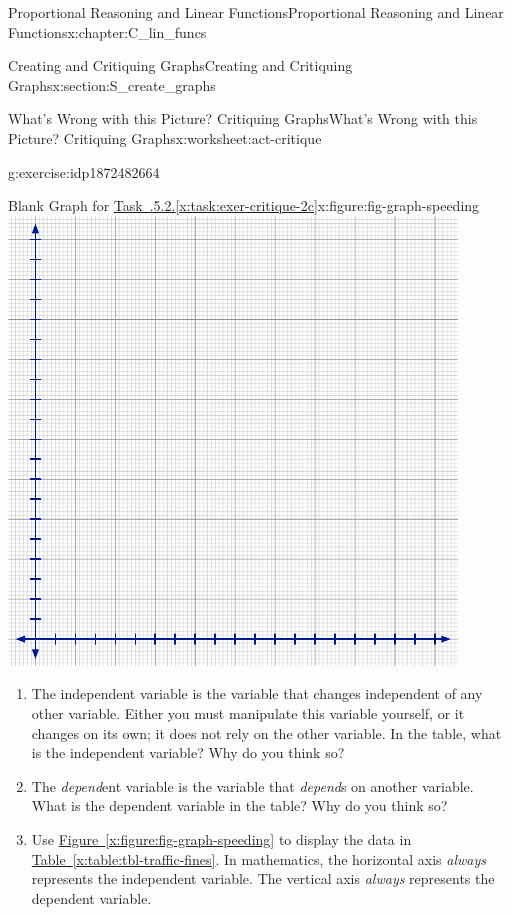 \documentclass[oneside,10pt,]{book}
\newcommand{\xreffont}{\relax}
\numberwithin{equation}{chapter}
\begin{document}
\begin{chapterptx}{Proportional Reasoning and Linear Functions}{}{Proportional Reasoning and Linear Functions}{}{}{x:chapter:C_lin_funcs}
\begin{sectionptx}{Creating and Critiquing Graphs}{}{Creating and Critiquing Graphs}{}{}{x:section:S_create_graphs}
\begin{worksheet-subsection}{What's Wrong with this Picture? Critiquing Graphs}{}{What's Wrong with this Picture? Critiquing Graphs}{}{}{x:worksheet:act-critique}
\begin{divisionexercise}{2}{}{}{g:exercise:idp1872482664}
\begin{sidebyside}{2}{0}{0}{0}
\begin{sbspanel}{0.5}
\begin{figureptx}{Blank Graph for \hyperref[x:task:exer-critique-2c]{Task~{\xreffont 2.2.5.2}.{\xreffont\ref{x:task:exer-critique-2c}}}}{x:figure:fig-graph-speeding}{}
\includegraphics[width=\linewidth]{external/blank-graph.pdf}
\tcblower
\end{figureptx}%
\end{sbspanel}%
\end{sidebyside}%
\begin{enumerate}[font=\bfseries,label=(\alph*),ref=\alph*]
\item{}The independent variable is the variable that changes independent of any other variable. Either you must manipulate this variable yourself, or it changes on its own; it does not rely on the other variable. In the table, what is the independent variable? Why do you think so?%
\item{}The \emph{depend}ent variable is the variable that \emph{depend}s on another variable. What is the dependent variable in the table? Why do you think so?%
\item\label{x:task:exer-critique-2c}Use \hyperref[x:figure:fig-graph-speeding]{Figure~{\xreffont\ref{x:figure:fig-graph-speeding}}} to display the data in \hyperref[x:table:tbl-traffic-fines]{Table~{\xreffont\ref{x:table:tbl-traffic-fines}}}. In mathematics, the horizontal axis \emph{always} represents the independent variable. The vertical axis \emph{always} represents the dependent variable.%
\end{enumerate}
\end{divisionexercise}%

\end{worksheet-subsection}
\end{sectionptx}
\end{chapterptx}
\end{document}

